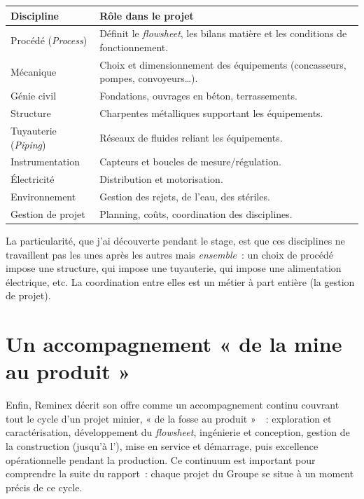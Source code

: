 \begin{center}
\renewcommand{\arraystretch}{1.25}
\begin{tabular}{@{}p{3.4cm} p{10.5cm}@{}}
\toprule
\textbf{Discipline} & \textbf{Rôle dans le projet} \\
\midrule
Procédé (\textit{Process}) & Définit le \textit{flowsheet}, les bilans matière et les conditions de fonctionnement. \\
Mécanique & Choix et dimensionnement des équipements (concasseurs, pompes, convoyeurs\ldots). \\
Génie civil & Fondations, ouvrages en béton, terrassements. \\
Structure & Charpentes métalliques supportant les équipements. \\
Tuyauterie (\textit{Piping}) & Réseaux de fluides reliant les équipements. \\
Instrumentation & Capteurs et boucles de mesure/régulation. \\
Électricité & Distribution et motorisation. \\
Environnement & Gestion des rejets, de l'eau, des stériles. \\
Gestion de projet & Planning, coûts, coordination des disciplines. \\
\bottomrule
\end{tabular}
\label{tab:disciplines}
\end{center}

La particularité, que j'ai découverte pendant le stage, est que ces disciplines ne travaillent pas les unes après les autres mais \emph{ensemble}~: un choix de procédé impose une structure, qui impose une tuyauterie, qui impose une alimentation électrique, etc. La coordination entre elles est un métier à part entière (la gestion de projet).

\section{Un accompagnement « de la mine au produit »}

Enfin, Reminex décrit son offre comme un accompagnement continu couvrant tout le cycle d'un projet minier, « de la fosse au produit »~\cite{reminex_capabilities}~: exploration et caractérisation, développement du \textit{flowsheet}, ingénierie et conception, gestion de la construction (jusqu'à l'), mise en service et démarrage, puis excellence opérationnelle pendant la production. Ce continuum est important pour comprendre la suite du rapport~: chaque projet du Groupe se situe à un moment précis de ce cycle.
